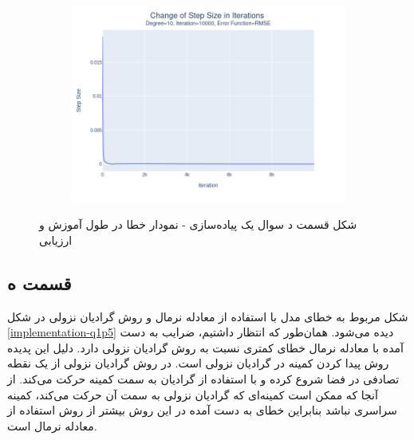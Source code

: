\documentclass[14pt,a4]{article}
\begin{document}
\begin{figure}[h]
\begin{subfigure}{0.3\linewidth}
        \includegraphics[width=\textwidth]{images/implementation/q1/part_d/step_size/10_10000_RMSE.png}
    \end{subfigure}
    \caption{شکل قسمت د سوال یک پیاده‌سازی - نمودار خطا در طول آموزش و ارزیابی}
    \label{implementation-q1p4-step-size}
\end{figure}

\subsection*{قسمت ه}

شکل مربوط به خطای مدل با استفاده از معادله نرمال و روش گرادیان نزولی در شکل \ref{implementation-q1p5} دیده می‌شود.
همان‌طور که انتظار داشتیم، ضرایب به دست آمده با معادله نرمال خطای کمتری نسبت به روش
گرادیان نزولی دارد. دلیل این پدیده روش پیدا کردن کمینه در گرادیان نزولی است. در روش گرادیان نزولی از
یک نقطه تصادفی در فضا شروع کرده و با استفاده از گرادیان به سمت کمینه حرکت می‌کند. از آنجا که
ممکن است کمینه‌ای که گرادیان نزولی به سمت آن حرکت می‌کند، کمینه سراسری نباشد بنابراین خطای به دست آمده
در این روش بیشتر از روش استفاده از معادله نرمال است.
\end{document}

